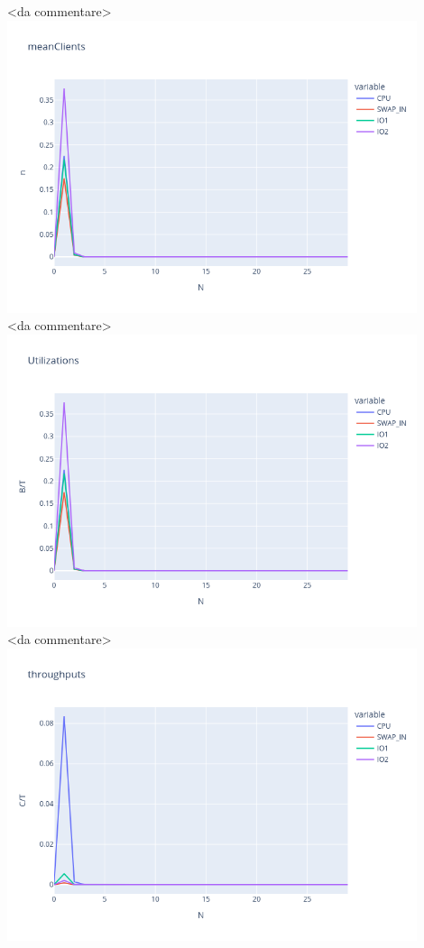 \documentclass[12pt,a4paper]{article}
\begin{document}
    <da commentare>
    \\
    \includegraphics[width=0.9\textwidth]{Images/meanClients.png}
    \\
    <da commentare>
    \\
    \includegraphics[width=0.9\textwidth]{Images/Utilizations.png}\\
    <da commentare>
    \\
    \includegraphics[width=0.9\textwidth]{Images/throughputs.png}
\end{document}
